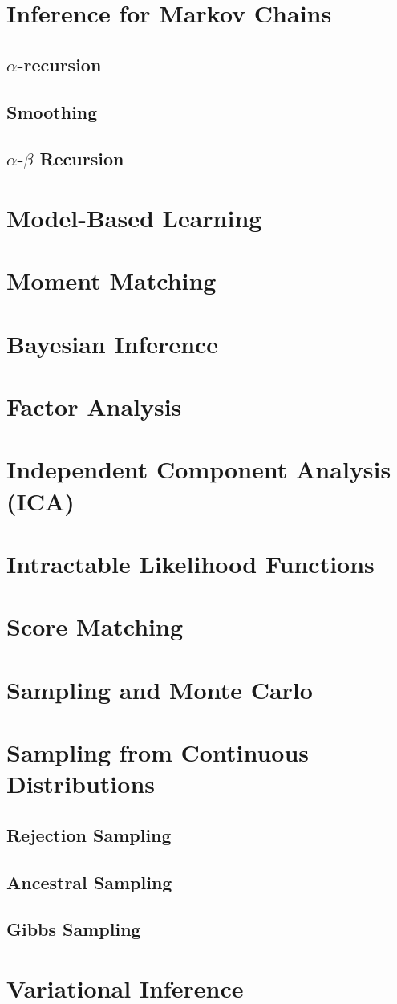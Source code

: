 \documentclass{article}
\begin{document}
\section{Inference for Markov Chains}
\subsection{$\alpha$-recursion}
\subsection{Smoothing}
\subsection{$\alpha$-$\beta$ Recursion}

\section{Model-Based Learning}
\section{Moment Matching}
\section{Bayesian Inference}
\section{Factor Analysis}
\section{Independent Component Analysis (ICA)}

\section{Intractable Likelihood Functions}
\section{Score Matching}
\section{Sampling and Monte Carlo}

\section{Sampling from Continuous Distributions}
\subsection{Rejection Sampling}
\subsection{Ancestral Sampling}
\subsection{Gibbs Sampling}

\section{Variational Inference}


\end{document}
